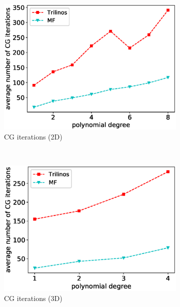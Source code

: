 \documentclass[AMA,STIX1COL]{WileyNJD-v2}
\begin{document}
\begin{figure}[!ht]
  \begin{subfigure}[b]{0.49\textwidth}
    \centering
    \includegraphics[width=\textwidth]{IWR_newest_patched_cg2d.eps}
    \caption{CG iterations (2D)}
    \label{fig:benchmark_miehe_IWR_cg2}
  \end{subfigure}
  ~
  \begin{subfigure}[b]{0.49\textwidth}
    \centering
    \includegraphics[width=\textwidth]{IWR_newest_patched_cg3d.eps}
    \caption{CG iterations (3D)}
    \label{fig:benchmark_miehe_IWR_cg3}
  \end{subfigure}
  ~
  \begin{subfigure}[b]{0.49\textwidth}
    \centering

\end{subfigure}
\end{figure}
\end{document}
